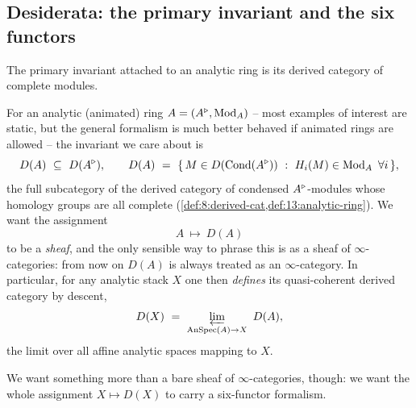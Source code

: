 \subsection{Desiderata: the primary invariant and the six functors}
\label{subsec:16:desiderata}

The primary invariant attached to an analytic ring is its derived category of
complete modules.

\begin{remark}
\label{rmk:16:primary-invariant}
For an analytic (animated) ring $A=(A^{\triangleright},\operatorname{Mod}_A)$ -- most examples of interest are
static, but the general formalism is much better behaved if animated rings are
allowed -- the invariant we care about is
\begin{equation*}
D(A)\ \subseteq\ D(A^{\triangleright}),\qquad
D(A)\ =\ \{\,M\in D(\operatorname{Cond}(A^{\triangleright}))\ :\ H_i(M)\in\operatorname{Mod}_A\ \forall i\,\},
\end{equation*}
the full subcategory of the derived category of condensed $A^{\triangleright}$-modules whose
homology groups are all complete (\cref{def:8:derived-cat,def:13:analytic-ring}). We
want the assignment
\begin{equation*}
A\ \longmapsto\ D(A)
\end{equation*}
to be a \emph{sheaf}, and the only sensible way to phrase this is as a sheaf of
$\infty$-categories: from now on $D(A)$ is always treated as an $\infty$-category.
In particular, for any analytic stack $X$ one then \emph{defines} its
quasi-coherent derived category by descent,
\begin{equation*}
D(X)\ =\ \varprojlim_{\AnSpec(A)\to X}\ D(A),
\end{equation*}
the limit over all affine analytic spaces mapping to $X$.
\end{remark}

We want something more than a bare sheaf of $\infty$-categories, though: we want the
whole assignment $X\mapsto D(X)$ to carry a six-functor formalism.

